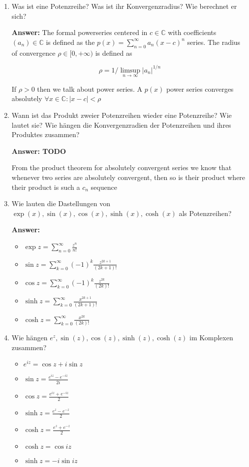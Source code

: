 \documentclass[11pt]{article}
\newcommand{\abs}[1]{\left|#1\right|}
\newcommand{\sumn}[4]{\sum_{#1=#2}^{#3}{#4}}
\newcommand{\CC}[0]{\mathbb{C}}
\begin{document}
\begin{enumerate}
    \item  Was ist eine Potenzreihe? Was ist ihr Konvergenzradius? Wie berechnet er sich?
    
    \textbf{Answer:} The formal powerseries centered in $c\in\CC$ with coefficients $(a_n) \in \CC$ is defined as the $p(x) = \sumn{n}{0}{\infty}{a_n(x-c)^n}$ series. The radius of convergence $\rho \in [0, +\infty)$ is defined as 

    $$\rho = 1/\limsup_{n\to\infty}\abs{a_n}^{1/n}$$

    If $\rho >0$ then we talk about power series. A $p(x)$ power series converges absolutely $\forall x\in\CC\colon \abs{x - c} < \rho$

    \item  Wann ist das Produkt zweier Potenzreihen wieder eine Potenzreihe? Wie lautet sie? Wie hängen die Konvergenzradien der Potenzreihen und ihres Produktes zusammen?
    
    \textbf{Answer: TODO}

    From the product theorem for absolutely convergent series we know that whenever two series are absolutely convergent, then so is their product where their product is such a $c_n$ sequence 



    \item  Wie lauten die Dastellungen von $\exp(x), \sin(x), \cos(x), \sinh(x), \cosh(x)$ als Potenzreihen?
    
    \textbf{Answer:}
    \begin{itemize}
        \item $\exp{z} = \sumn{n}{0}{\infty}{\frac{z^n}{n!}}$
        \item $\sin{z} = \sumn{k}{0}{\infty}{(-1)^k\frac{z^{2k+1}}{(2k+1)!}}$
        \item $\cos{z} = \sumn{k}{0}{\infty}{(-1)^k\frac{z^{2k}}{(2k)!}}$
        \item $\sinh{z} = \sumn{k}{0}{\infty}{\frac{x^{2k+1}}{(2k+1)!}}$
        \item $\cosh{z} = \sumn{k}{0}{\infty}{\frac{x^{2k}}{(2k)!}}$
    \end{itemize}

    \item  Wie hängen $e^z, \sin(z), \cos(z), \sinh(z), \cosh(z)$ im Komplexen zusammen?

    \begin{itemize}
        \item $e^{iz} = \cos{z} + i \sin{z}$
        \item $\sin{z} = \frac{e^{iz} - e^{-iz}}{2i}$
        \item $\cos{z} = \frac{e^{iz} + e^{-iz}}{2}$
        \item $\sinh{z} = \frac{e^{z} - e^{-z}}{2}$
        \item $\cosh{z} = \frac{e^{z} + e^{-z}}{2}$
        \item $\cosh{z} = \cos{iz}$
        \item $\sinh{z} = -i\sin{iz}$
    \end{itemize}
\end{enumerate}
\end{document}
